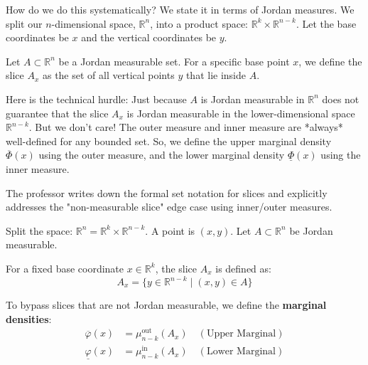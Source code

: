 \begin{spoken_clean}[00:42:00 - 00:46:30]
How do we do this systematically? We state it in terms of Jordan measures. We split our $n$-dimensional space, $\mathbb{R}^n$, into a product space: $\mathbb{R}^k \times \mathbb{R}^{n-k}$. Let the base coordinates be $x$ and the vertical coordinates be $y$. 

Let $A \subset \mathbb{R}^n$ be a Jordan measurable set. For a specific base point $x$, we define the slice $A_x$ as the set of all vertical points $y$ that lie inside $A$. 

Here is the technical hurdle: Just because $A$ is Jordan measurable in $\mathbb{R}^n$ does not guarantee that the slice $A_x$ is Jordan measurable in the lower-dimensional space $\mathbb{R}^{n-k}$. But we don't care! The outer measure and inner measure are *always* well-defined for any bounded set. So, we define the upper marginal density $\overline{\Phi}(x)$ using the outer measure, and the lower marginal density $\underline{\Phi}(x)$ using the inner measure.
\end{spoken_clean}

\begin{nice-box}
The professor writes down the formal set notation for slices and explicitly addresses the "non-measurable slice" edge case using inner/outer measures.
\end{nice-box}

\begin{math_stroke}
Split the space: $\mathbb{R}^n = \mathbb{R}^k \times \mathbb{R}^{n-k}$. A point is $(x,y)$.
Let $A \subset \mathbb{R}^n$ be Jordan measurable.
\end{math_stroke}

\begin{orangeformula}
\begin{definition}[Slices]
For a fixed base coordinate $x \in \mathbb{R}^k$, the slice $A_x$ is defined as:
\[
A_x = \{ y \in \mathbb{R}^{n-k} \mid (x,y) \in A \}
\]
\end{definition}
\end{orangeformula}

\begin{math_stroke}
To bypass slices that are not Jordan measurable, we define the \textbf{marginal densities}:
\begin{align*}
\overline{\varphi}(x) &= \mu_{n-k}^{\text{out}}(A_x) \quad (\text{Upper Marginal}) \\
\underline{\varphi}(x) &= \mu_{n-k}^{\text{in}}(A_x) \quad (\text{Lower Marginal})
\end{align*}
\end{math_stroke}

